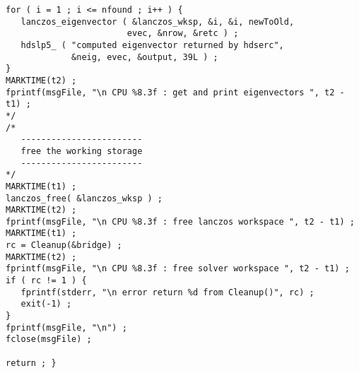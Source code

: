 \begin{verbatim}
for ( i = 1 ; i <= nfound ; i++ ) {
   lanczos_eigenvector ( &lanczos_wksp, &i, &i, newToOld,
                        evec, &nrow, &retc ) ;
   hdslp5_ ( "computed eigenvector returned by hdserc",
             &neig, evec, &output, 39L ) ;
}
MARKTIME(t2) ;
fprintf(msgFile, "\n CPU %8.3f : get and print eigenvectors ", t2 - t1) ;
*/
/*
   ------------------------
   free the working storage
   ------------------------
*/
MARKTIME(t1) ;
lanczos_free( &lanczos_wksp ) ;
MARKTIME(t2) ;
fprintf(msgFile, "\n CPU %8.3f : free lanczos workspace ", t2 - t1) ;
MARKTIME(t1) ;
rc = Cleanup(&bridge) ;
MARKTIME(t2) ;
fprintf(msgFile, "\n CPU %8.3f : free solver workspace ", t2 - t1) ;
if ( rc != 1 ) {
   fprintf(stderr, "\n error return %d from Cleanup()", rc) ;
   exit(-1) ;
}
fprintf(msgFile, "\n") ;
fclose(msgFile) ;

return ; }
\end{verbatim}

